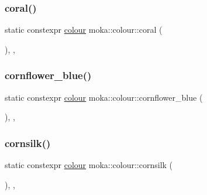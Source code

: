 \subsubsection{\texorpdfstring{coral()}{coral()}}
{\footnotesize\ttfamily static constexpr \mbox{\hyperlink{classmoka_1_1colour}{colour}} moka\+::colour\+::coral (\begin{DoxyParamCaption}{ }\end{DoxyParamCaption})\hspace{0.3cm}{\ttfamily [inline]}, {\ttfamily [static]}, {\ttfamily [noexcept]}}

\mbox{\label{classmoka_1_1colour_a8a5bb984d5d031bde9c0c7beb1f5cf3a}} 
\subsubsection{\texorpdfstring{cornflower\_blue()}{cornflower\_blue()}}
{\footnotesize\ttfamily static constexpr \mbox{\hyperlink{classmoka_1_1colour}{colour}} moka\+::colour\+::cornflower\+\_\+blue (\begin{DoxyParamCaption}{ }\end{DoxyParamCaption})\hspace{0.3cm}{\ttfamily [inline]}, {\ttfamily [static]}, {\ttfamily [noexcept]}}

\mbox{\label{classmoka_1_1colour_abf7f389449cbe46d41dea47c7b7fa841}} 
\subsubsection{\texorpdfstring{cornsilk()}{cornsilk()}}
{\footnotesize\ttfamily static constexpr \mbox{\hyperlink{classmoka_1_1colour}{colour}} moka\+::colour\+::cornsilk (\begin{DoxyParamCaption}{ }\end{DoxyParamCaption})\hspace{0.3cm}{\ttfamily [inline]}, {\ttfamily [static]}, {\ttfamily [noexcept]}}

\mbox{\label{classmoka_1_1colour_a5d1bf668084bbf8bbc7f1f71a9832659}} 
